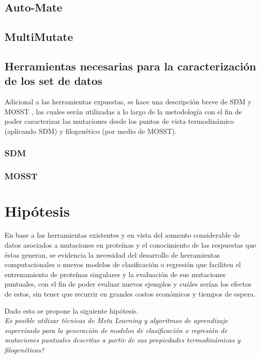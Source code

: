 \subsection{Auto-Mate}


\subsection{MultiMutate}


\subsection{Herramientas necesarias para la caracterización de los set de datos}

Adicional a las herramientas expuestas, se hace una descripción breve de SDM \cite{Pandurangan2017} y MOSST \cite{Olivera-Nappa2011}, las cuales serán utilizadas a lo largo de la metodología con el fin de poder caracterizar las mutaciones desde los puntos de vista termodinámico (aplicando SDM) y filogenético (por medio de MOSST).

\subsubsection{SDM}

\subsubsection{MOSST}

\section{Hipótesis}

En base a las herramientas existentes y en vista del aumento considerable de datos asociados a mutaciones en proteínas y el conocimiento de las respuestas que éstas generan, se evidencia la necesidad del desarrollo de herramientas computacionales o nuevos modelos de clasificación o regresión que faciliten el entrenamiento de proteínas singulares y la evaluación de sus mutaciones puntuales, con el fin de poder evaluar nuevos ejemplos y cuáles serían los efectos de estos, sin tener que recurrir en grandes costos económicos y tiempos de espera. 

Dado esto se propone la siguiente hipótesis.\\

\textit{Es posible utilizar técnicas de Meta Learning y algoritmos de aprendizaje supervisado para la generación de modelos de clasificación o regresión de mutaciones puntuales descritas a partir de sus propiedades termodinámicas y filogenéticas?}\\

